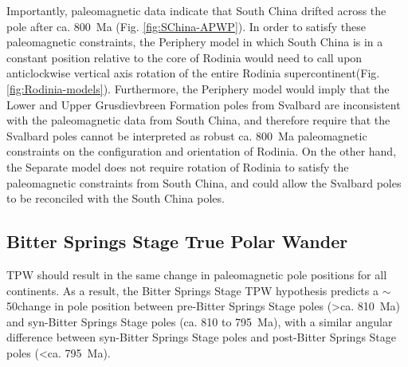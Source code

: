 Importantly, paleomagnetic data indicate that South China drifted across the pole after ca. 800~Ma (Fig. \ref{fig:SChina-APWP}). In order to satisfy these paleomagnetic constraints, the Periphery model in which South China is in a constant position relative to the core of Rodinia would need to call upon anticlockwise vertical axis rotation of the entire Rodinia supercontinent(Fig. \ref{fig:Rodinia-models}). Furthermore, the Periphery model would imply that the Lower and Upper Grusdievbreen Formation poles from Svalbard are inconsistent with the paleomagnetic data from South China, and therefore require that the Svalbard poles cannot be interpreted as robust ca. 800~Ma paleomagnetic constraints on the configuration and orientation of Rodinia. On the other hand, the Separate model does not require rotation of Rodinia to satisfy the paleomagnetic constraints from South China, and could allow the Svalbard poles to be reconciled with the South China poles.

\subsection{Bitter Springs Stage True Polar Wander}

TPW should result in the same change in paleomagnetic pole positions for all continents. As a result, the Bitter Springs Stage TPW hypothesis predicts a $\sim$50\degrees change in pole position between pre-Bitter Springs Stage poles (\textgreater ca. 810~Ma) and syn-Bitter Springs Stage poles (ca. 810 to 795~Ma), with a similar angular difference between syn-Bitter Springs Stage poles and post-Bitter Springs Stage poles (\textless ca. 795~Ma).


